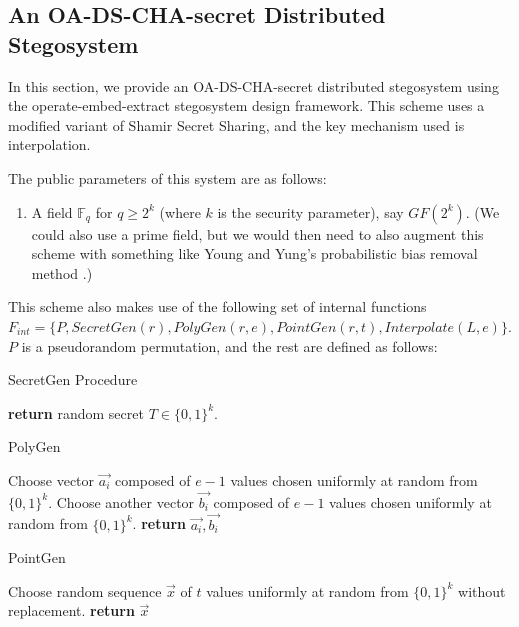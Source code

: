 \documentclass{article}
\begin{document}
\subsection{An OA-DS-CHA-secret Distributed Stegosystem}

In this section, we provide an OA-DS-CHA-secret distributed stegosystem using the operate-embed-extract stegosystem design framework. 
This scheme uses a modified variant of Shamir Secret Sharing, and the key mechanism used is interpolation.

\noindent The public parameters of this system are as follows:
\begin{enumerate}
\item{A field $\mathbb{F}_q$ for $q \geq 2^k$ (where $k$ is the security parameter), say $GF(2^k)$.  (We could also 
use a prime field, but we would then need to also augment this scheme with something like Young and Yung's probabilistic 
bias removal method \cite{YoungPBRM}.)}
\end{enumerate}

\noindent This scheme also makes use of the following set of internal functions \newline
$F_{int} = \{ P, SecretGen(r), PolyGen(r,e), PointGen(r,t), Interpolate(L, e) \}$.
$P$ is a pseudorandom permutation, and the rest are defined as follows:

\begin{algorithm}[H]
\caption{SecretGen Procedure}\label{1a}
\begin{algorithmic}[1]
\State \textbf{return} random secret $T \in \{0,1\}^k$.
\EndProcedure
\end{algorithmic}
\end{algorithm}

\begin{algorithm}[H]
\caption{PolyGen}\label{1a}
\begin{algorithmic}[1]
\State Choose vector $\vec{a_i}$ composed of $e-1$ values chosen uniformly at random from $\{0,1\}^k$.
\State Choose another vector $\vec{b_i}$ composed of $e-1$ values chosen uniformly at random from $\{0,1\}^k$.
\State \textbf{return} $\vec{a_i}, \vec{b_i}$
\EndProcedure
\end{algorithmic}
\end{algorithm}

\begin{algorithm}[H]
\caption{PointGen}\label{1a}
\begin{algorithmic}[1]
\State Choose random sequence $\vec{x}$ of $t$ values uniformly at random from $\{0,1\}^k$ without replacement.
\State \textbf{return} $\vec{x}$
\EndProcedure
\end{algorithmic}
\end{algorithm}
\end{document}

